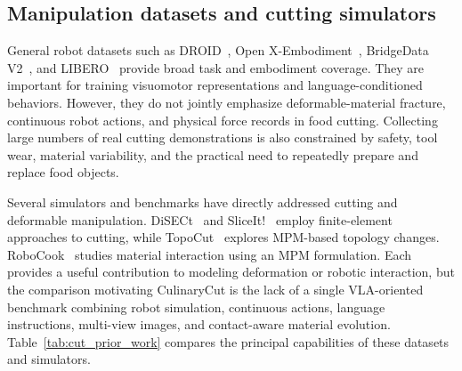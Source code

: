 \subsection{Manipulation datasets and cutting simulators}
\label{subsec:cut_related_datasets}

General robot datasets such as DROID~\cite{khazatsky2025droidlargescaleinthewildrobot}, Open X-Embodiment~\cite{o2024open}, BridgeData V2~\cite{bridgedata2023}, and LIBERO~\cite{libero2023} provide broad task and embodiment coverage. They are important for training visuomotor representations and language-conditioned behaviors. However, they do not jointly emphasize deformable-material fracture, continuous robot actions, and physical force records in food cutting. Collecting large numbers of real cutting demonstrations is also constrained by safety, tool wear, material variability, and the practical need to repeatedly prepare and replace food objects.

Several simulators and benchmarks have directly addressed cutting and deformable manipulation. DiSECt~\cite{disect2022} and SliceIt!~\cite{sliceit2024} employ finite-element approaches to cutting, while TopoCut~\cite{topocut2025} explores MPM-based topology changes. RoboCook~\cite{shi2023robocook} studies material interaction using an MPM formulation. Each provides a useful contribution to modeling deformation or robotic interaction, but the comparison motivating CulinaryCut is the lack of a single VLA-oriented benchmark combining robot simulation, continuous actions, language instructions, multi-view images, and contact-aware material evolution. Table~\ref{tab:cut_prior_work} compares the principal capabilities of these datasets and simulators.

